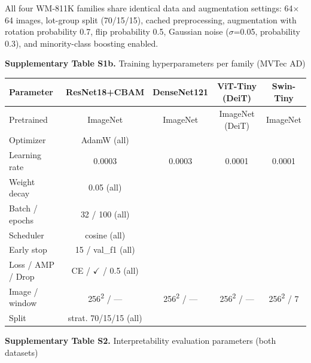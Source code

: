 \documentclass[11pt,a4paper]{article}
\begin{document}
All four WM-811K families share identical data and augmentation settings: 64$\times$64 images, lot-group split (70/15/15), cached preprocessing, augmentation with rotation probability 0.7, flip probability 0.5, Gaussian noise ($\sigma$=0.05, probability 0.3), and minority-class boosting enabled.

\begin{center}
\small \textbf{Supplementary Table S1b.} Training hyperparameters per family (MVTec AD)
\end{center}

\begin{tabular}{lcccc}
\toprule
Parameter & ResNet18+CBAM & DenseNet121 & ViT-Tiny (DeiT) & Swin-Tiny \\
\midrule
Pretrained & ImageNet & ImageNet & ImageNet (DeiT) & ImageNet \\
Optimizer & AdamW (all) &  &  &  \\
Learning rate & 0.0003 & 0.0003 & 0.0001 & 0.0001 \\
Weight decay & 0.05 (all) &  &  &  \\
Batch / epochs & 32 / 100 (all) &  &  &  \\
Scheduler & cosine (all) &  &  &  \\
Early stop & 15 / val\_f1 (all) &  &  &  \\
Loss / AMP / Drop & CE / $\checkmark$ / 0.5 (all) &  &  &  \\
Image / window & 256\textsuperscript{2} / --- & 256\textsuperscript{2} / --- & 256\textsuperscript{2} / --- & 256\textsuperscript{2} / 7 \\
Split & strat. 70/15/15 (all) &  &  &  \\
\bottomrule
\end{tabular}


\begin{center}
\small \textbf{Supplementary Table S2.} Interpretability evaluation parameters (both datasets)
\end{center}
\end{document}
